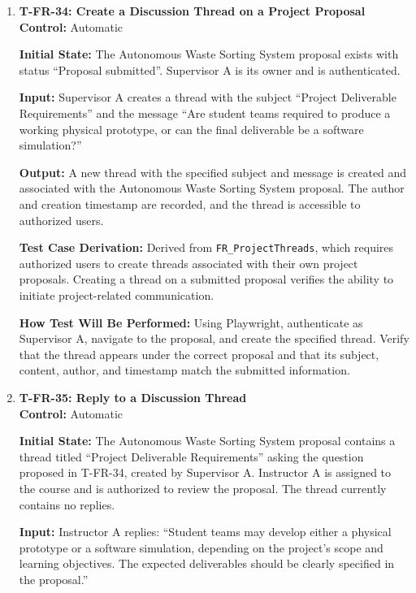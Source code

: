 \documentclass[12pt, titlepage]{article}
\begin{document}
\begin{enumerate}

\item \label{T-FR-34}\textbf{T-FR-34: Create a Discussion Thread on a Project Proposal}\\

\textbf{Control:} Automatic

\textbf{Initial State:} The Autonomous Waste Sorting System proposal exists with status ``Proposal submitted''. Supervisor A is its owner and is authenticated.

\textbf{Input:} Supervisor A creates a thread with the subject ``Project Deliverable Requirements'' and the message ``Are student teams required to produce a working physical prototype, or can the final deliverable be a software simulation?''

\textbf{Output:} A new thread with the specified subject and message is created and associated with the Autonomous Waste Sorting System proposal. The author and creation timestamp are recorded, and the thread is accessible to authorized users.

\textbf{Test Case Derivation:} Derived from \texttt{FR\_ProjectThreads}, which requires authorized users to create threads associated with their own project proposals. Creating a thread on a submitted proposal verifies the ability to initiate project-related communication.

\textbf{How Test Will Be Performed:} Using Playwright, authenticate as Supervisor A, navigate to the proposal, and create the specified thread. Verify that the thread appears under the correct proposal and that its subject, content, author, and timestamp match the submitted information.

\item \label{T-FR-35}\textbf{T-FR-35: Reply to a Discussion Thread}\\

\textbf{Control:} Automatic

\textbf{Initial State:} The Autonomous Waste Sorting System proposal contains a thread titled ``Project Deliverable Requirements'' asking the question proposed in T-FR-34, created by Supervisor A. Instructor A is assigned to the course and is authorized to review the proposal. The thread currently contains no replies.

\textbf{Input:} Instructor A replies: ``Student teams may develop either a physical prototype or a software simulation, depending on the project's scope and learning objectives. The expected deliverables should be clearly specified in the proposal.''


\end{enumerate}
\end{document}
